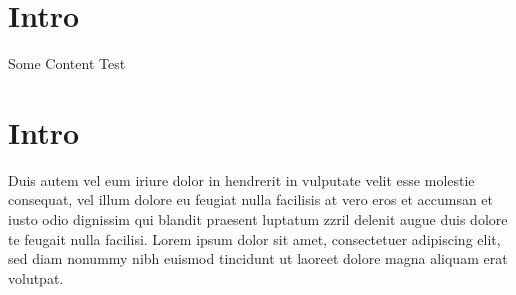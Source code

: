 \documentclass[12pt,a4paper,twocolumn]{article}
\begin{document}

    \section{Intro}
    Some Content \cite{Author:Year:Abbr:1111111}
    Test

    \section{Intro}
    Duis autem vel eum iriure dolor in hendrerit in vulputate velit esse molestie consequat, vel illum dolore eu feugiat nulla facilisis at vero eros et accumsan et iusto odio dignissim qui blandit praesent luptatum zzril delenit augue duis dolore te feugait nulla facilisi. Lorem ipsum dolor sit amet, consectetuer adipiscing elit, sed diam nonummy nibh euismod tincidunt ut laoreet dolore magna aliquam erat volutpat.

    
    
\end{document}
